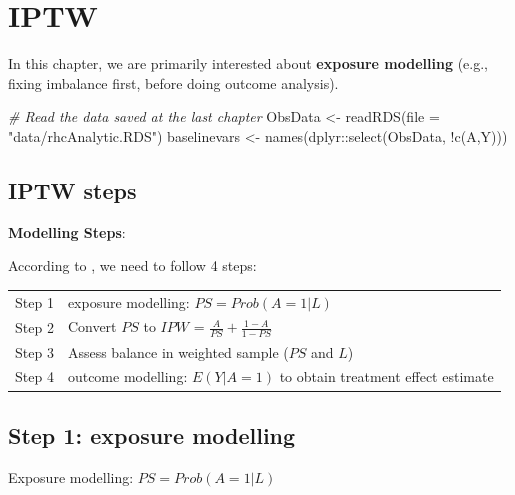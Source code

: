 \documentclass[
]{book}
\newenvironment{Shaded}{\begin{snugshade}}{\end{snugshade}}
\newcommand{\AttributeTok}[1]{\textcolor[rgb]{0.77,0.63,0.00}{#1}}
\newcommand{\CommentTok}[1]{\textcolor[rgb]{0.56,0.35,0.01}{\textit{#1}}}
\newcommand{\FunctionTok}[1]{\textcolor[rgb]{0.00,0.00,0.00}{#1}}
\newcommand{\NormalTok}[1]{#1}
\newcommand{\OtherTok}[1]{\textcolor[rgb]{0.56,0.35,0.01}{#1}}
\newcommand{\SpecialCharTok}[1]{\textcolor[rgb]{0.00,0.00,0.00}{#1}}
\newcommand{\StringTok}[1]{\textcolor[rgb]{0.31,0.60,0.02}{#1}}
\begin{document}
\hypertarget{iptw}{%
\chapter{IPTW}\label{iptw}}

\begin{rmdcomment}
In this chapter, we are primarily interested about \textbf{exposure
modelling} (e.g., fixing imbalance first, before doing outcome
analysis).
\end{rmdcomment}

\begin{Shaded}
\begin{Highlighting}[]
\CommentTok{\# Read the data saved at the last chapter}
\NormalTok{ObsData }\OtherTok{\textless{}{-}} \FunctionTok{readRDS}\NormalTok{(}\AttributeTok{file =} \StringTok{"data/rhcAnalytic.RDS"}\NormalTok{)}
\NormalTok{baselinevars }\OtherTok{\textless{}{-}} \FunctionTok{names}\NormalTok{(dplyr}\SpecialCharTok{::}\FunctionTok{select}\NormalTok{(ObsData, }\SpecialCharTok{!}\FunctionTok{c}\NormalTok{(A,Y)))}
\end{Highlighting}
\end{Shaded}

\hypertarget{iptw-steps}{%
\section{IPTW steps}\label{iptw-steps}}

\textbf{Modelling Steps}:

According to \citet{austin2011tutorial}, we need to follow 4 steps:

\begin{longtable}[]{@{}ll@{}}
\toprule
\endhead
Step 1 & exposure modelling: \(PS = Prob(A=1|L)\)\tabularnewline
Step 2 & Convert \(PS\) to \(IPW\) = \(\frac{A}{PS} + \frac{1-A}{1-PS}\)\tabularnewline
Step 3 & Assess balance in weighted sample (\(PS\) and \(L\))\tabularnewline
Step 4 & outcome modelling: \(E(Y|A=1)\) to obtain treatment effect estimate\tabularnewline
\bottomrule
\end{longtable}

\hypertarget{step-1-exposure-modelling}{%
\section{Step 1: exposure modelling}\label{step-1-exposure-modelling}}

\begin{rmdcomment}
Exposure modelling: \(PS = Prob(A=1|L)\)
\end{rmdcomment}
\end{document}
